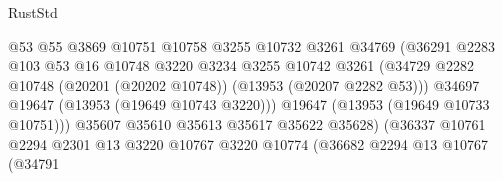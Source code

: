 \begin{lexlean}{RustStd}
\begin{coremodule}
                                            @53
                                            @55
                                            @3869
                                            @10751
                                            @10758
                                            @3255
                                            @10732
                                            @3261
                                            @34769
                                            (@36291
                                              @2283
                                              @103
                                              @53
                                              @16
                                              @10748
                                              @3220
                                              @3234
                                              @3255
                                              @10742
                                              @3261
                                              (@34729
                                                @2282
                                                @10748
                                                (@20201 (@20202 @10748))
                                                (@13953 (@20207 @2282 @53)))
                                              @34697
                                              @19647
                                              (@13953 (@19649 @10743 @3220)))
                                            @19647
                                            (@13953 (@19649 @10733 @10751)))
                                          @35607
                                          @35610
                                          @35613
                                          @35617
                                          @35622
                                          @35628)
                                        (@36337
                                          @10761
                                          @2294
                                          @2301
                                          @13
                                          @3220
                                          @10767
                                          @3220
                                          @10774
                                          (@36682
                                            @2294
                                            @13
                                            @10767
                                            (@34791

\end{coremodule}
\end{lexlean}
